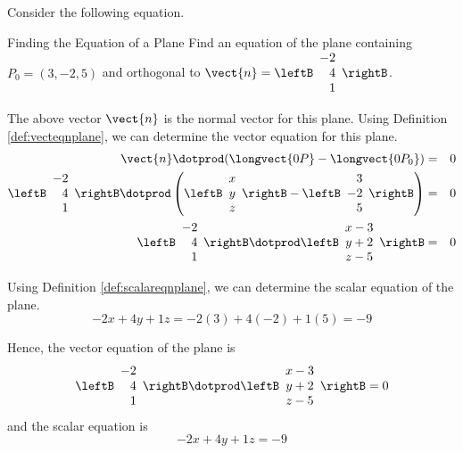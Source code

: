 Consider the following equation.

\begin{example}{Finding the Equation of a Plane}\label{exa:findingeqnplane}
Find an equation of the plane containing $P_0 = (3, -2, 5)$ and orthogonal to $\vect{n} = 
\leftB
\begin{array}{r}
-2 \\
4 \\
1
\end{array}
\rightB$. 
\end{example}

\begin{solution}
The above vector $\vect{n}$ is the normal vector for this plane.
Using Definition \ref{def:vecteqnplane}, we can determine the vector equation for this plane. 
\begin{eqnarray*}
\vect{n} \dotprod (\longvect{0P} - \longvect{0P_0}) &=& 0 \\
\leftB
\begin{array}{r}
-2 \\
4 \\
1
\end{array}
\rightB 
\dotprod 
\left(\leftB
\begin{array}{c}
x \\
y \\
z
\end{array}
\rightB
-
\leftB
\begin{array}{r}
3 \\
-2 \\
5
\end{array}
\rightB \right) &=& 0 \\
\leftB
\begin{array}{r}
-2 \\
4 \\
1
\end{array}
\rightB 
\dotprod 
\leftB
\begin{array}{c}
x - 3 \\
y + 2 \\
z - 5
\end{array}
\rightB
&=& 0 
\end{eqnarray*} 

Using Definition \ref{def:scalareqnplane}, we can determine the scalar equation of the plane. 
\[
-2x + 4y + 1z = -2(3) + 4(-2) + 1(5) = -9
\]

Hence, the vector equation of the plane is
\[
\leftB
\begin{array}{r}
-2 \\
4 \\
1
\end{array}
\rightB 
\dotprod 
\leftB
\begin{array}{c}
x - 3 \\
y + 2 \\
z - 5
\end{array}
\rightB
= 0 
\]
and the scalar equation is 
\[
-2x + 4y + 1z = -9
\]
\end{solution}

